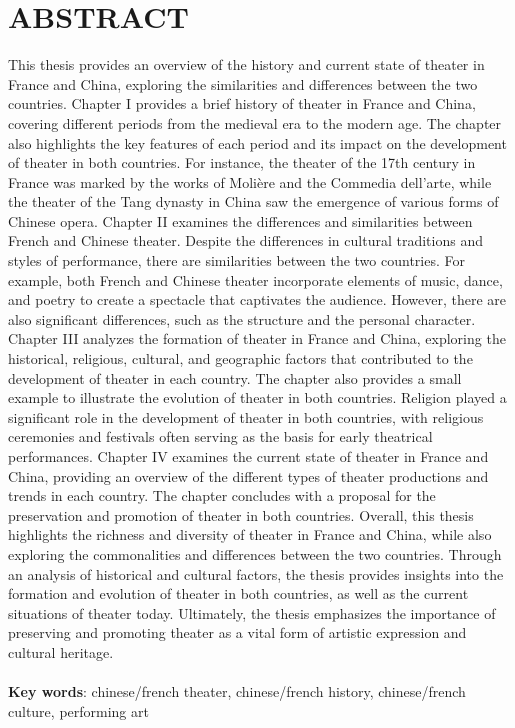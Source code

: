 \documentclass[UTF8,a4paper,12pt]{ctexart}
\numberwithin{equation}{section}
\begin{document}
\newpage
{}
\section*{ABSTRACT}

\hspace{8mm}
This thesis provides an overview of the history and current state of theater in France and China, exploring the similarities and differences between the two countries. Chapter I provides a brief history of theater in France and China, covering different periods from the medieval era to the modern age. The chapter also highlights the key features of each period and its impact on the development of theater in both countries. For instance, the theater of the 17th century in France was marked by the works of Molière and the Commedia dell'arte, while the theater of the Tang dynasty in China saw the emergence of various forms of Chinese opera.
Chapter II examines the differences and similarities between French and Chinese theater. Despite the differences in cultural traditions and styles of performance, there are similarities between the two countries. For example, both French and Chinese theater incorporate elements of music, dance, and poetry to create a spectacle that captivates the audience. However, there are also significant differences, such as the structure and the personal character.
Chapter III analyzes the formation of theater in France and China, exploring the historical, religious, cultural, and geographic factors that contributed to the development of theater in each country. The chapter also provides a small example to illustrate the evolution of theater in both countries. Religion played a significant role in the development of theater in both countries, with religious ceremonies and festivals often serving as the basis for early theatrical performances.
Chapter IV examines the current state of theater in France and China, providing an overview of the different types of theater productions and trends in each country. The chapter concludes with a proposal for the preservation and promotion of theater in both countries.
Overall, this thesis highlights the richness and diversity of theater in France and China, while also exploring the commonalities and differences between the two countries. Through an analysis of historical and cultural factors, the thesis provides insights into the formation and evolution of theater in both countries, as well as the current situations of theater today. Ultimately, the thesis emphasizes the importance of preserving and promoting theater as a vital form of artistic expression and cultural heritage.\\ 
~\\
\textbf{Key words}: chinese/french theater, chinese/french history, chinese/french culture, performing art \\
\end{document}
